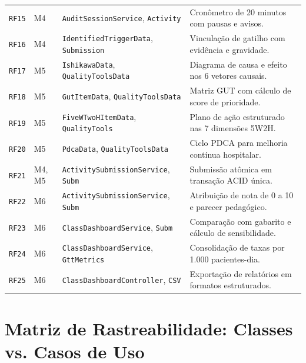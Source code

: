 \begin{table}[!ht]
\begin{tabularx}{\textwidth}{p{1.8cm} p{1.4cm} p{4.8cm} X}
\texttt{RF15} & M4 & \texttt{AuditSessionService}, \texttt{Activity} & Cronômetro de 20 minutos com pausas e avisos. \\
\texttt{RF16} & M4 & \texttt{IdentifiedTriggerData}, \texttt{Submission} & Vinculação de gatilho com evidência e gravidade. \\
\texttt{RF17} & M5 & \texttt{IshikawaData}, \texttt{QualityToolsData} & Diagrama de causa e efeito nos 6 vetores causais. \\
\texttt{RF18} & M5 & \texttt{GutItemData}, \texttt{QualityToolsData} & Matriz GUT com cálculo de score de prioridade. \\
\texttt{RF19} & M5 & \texttt{FiveWTwoHItemData}, \texttt{QualityTools} & Plano de ação estruturado nas 7 dimensões 5W2H. \\
\texttt{RF20} & M5 & \texttt{PdcaData}, \texttt{QualityToolsData} & Ciclo PDCA para melhoria contínua hospitalar. \\
\texttt{RF21} & M4, M5 & \texttt{ActivitySubmission}\newline\texttt{Service}, \texttt{Subm} & Submissão atômica em transação ACID única. \\
\texttt{RF22} & M6 & \texttt{ActivitySubmission}\newline\texttt{Service}, \texttt{Subm} & Atribuição de nota de 0 a 10 e parecer pedagógico. \\
\texttt{RF23} & M6 & \texttt{ClassDashboardService}, \texttt{Subm} & Comparação com gabarito e cálculo de sensibilidade. \\
\texttt{RF24} & M6 & \texttt{ClassDashboardService}, \texttt{GttMetrics} & Consolidação de taxas por 1.000 pacientes-dia. \\
\texttt{RF25} & M6 & \texttt{ClassDashboard}\newline\texttt{Controller}, \texttt{CSV} & Exportação de relatórios em formatos estruturados. \\
\bottomrule
\end{tabularx}
\end{table}

\section{Matriz de Rastreabilidade: Classes vs. Casos de Uso}
\label{sec_matriz_classes_uc}

